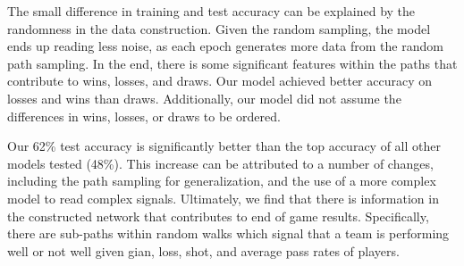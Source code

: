 The small difference in training and test accuracy can be explained by the randomness in the data construction. Given the random sampling, the model ends up reading less noise, as each epoch generates more data from the random path sampling. In the end, there is some significant features within the paths that contribute to wins, losses, and draws. Our model achieved better accuracy on losses and wins than draws. Additionally, our model did not assume the differences in wins, losses, or draws to be ordered. 

Our 62\% test accuracy is significantly better than the top accuracy of all other models tested (48\%). This increase can be attributed to a number of changes, including the path sampling for generalization, and the use of a more complex model to read complex signals. Ultimately, we find that there is information in the constructed network that contributes to end of game results. Specifically, there are sub-paths within random walks which signal that a team is performing well or not well given gian, loss, shot, and average pass rates of players. 



